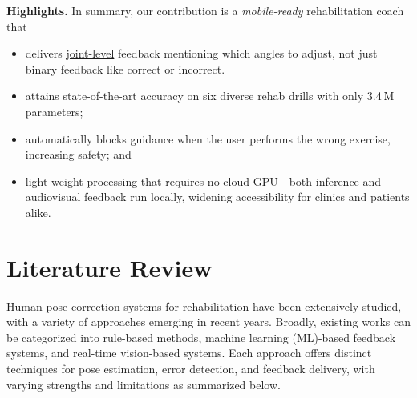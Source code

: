 \documentclass{article}
\begin{document}
\textbf{Highlights.}  
In summary, our contribution is a \emph{mobile-ready} rehabilitation coach that  
\begin{itemize}
\item delivers \underline{joint-level} feedback mentioning which angles to adjust, not just binary feedback like correct or incorrect.
\item attains state-of-the-art accuracy on six diverse rehab drills with only 3.4 M parameters;  
\item automatically blocks guidance when the user performs the wrong exercise, increasing safety; and  
\item light weight processing that requires no cloud GPU—both inference and audiovisual feedback run locally, widening accessibility for clinics and patients alike.  
\end{itemize}


\section{Literature Review}
Human pose correction systems for rehabilitation have been extensively studied, with a variety of approaches emerging in recent years. Broadly, existing works can be categorized into rule-based methods, machine learning (ML)-based feedback systems, and real-time vision-based systems. Each approach offers distinct techniques for pose estimation, error detection, and feedback delivery, with varying strengths and limitations as summarized below. 
\end{document}
